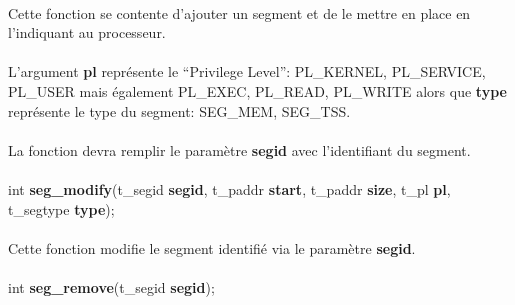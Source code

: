 \documentclass[10pt,a4wide]{article}
\begin{document}
\paragraph{}

Cette fonction se contente d'ajouter un segment et de le mettre en
place en l'indiquant au processeur.

\paragraph{}

L'argument \textbf{pl} repr\'esente le ``Privilege Level'': PL\_KERNEL,
PL\_SERVICE, PL\_USER mais \'egalement PL\_EXEC, PL\_READ, PL\_WRITE
alors que \textbf{type} repr\'esente le type du segment: SEG\_MEM, SEG\_TSS.

\paragraph{}

La fonction devra remplir le param\`etre \textbf{segid} avec l'identifiant
du segment.

\paragraph{}

\hspace{1.5cm}int \textbf{seg\_modify}(t\_segid \textbf{segid},
                                       t\_paddr \textbf{start},
                                       t\_paddr \textbf{size},
                                       t\_pl \textbf{pl},
                                       t\_segtype \textbf{type});

\paragraph{}

Cette fonction modifie le segment identifi\'e via le param\`etre
\textbf{segid}.

\paragraph{}

\hspace{1.5cm}int \textbf{seg\_remove}(t\_segid \textbf{segid});

\paragraph{}
\end{document}
